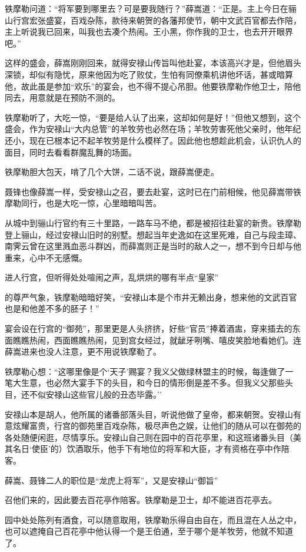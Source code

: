 \documentclass[12pt,oneside]{book}
\begin{document}
铁摩勒问道：``将军要到哪里去？可是要我随行？''薛嵩道：``正是。主上今日在骊山行宫宏张盛宴，百戏杂陈，款待来朝贺的各藩邦使节，朝中文武百官都去作陪，主上听说我已回来，叫我也去凑个热闹。王小黑，你作我的卫士，也去开开眼界吧。''

这样的盛会，薛嵩刚刚回来，就得安禄山传旨叫他赴宴，本该高兴才是，但他眉头深锁，却似有隐忧，原来他因为吃了败仗，生怕有同僚乘机讲他坏话，甚或暗算他，故此虽是参加``欢乐''的宴会，也不得不提心吊胆。他要铁摩勒作他卫士，陪他同去，用意就是在预防不测的。

铁摩勒听了，大吃一惊，``要是给人认了出来，这却如何是好！''但他又想到，这个盛会，作为安禄山``大内总管''的羊牧劳也必然在场；羊牧劳害死他父亲时，他年纪还小，现在已根本记不起羊牧劳是什么模样了。因此他也想趁此机会，认识仇人的面目，同时去看看群魔乱舞的场面。

铁摩勒胆大包天，啃了几个大饼，二话不说，跟薛嵩便走。

聂锋也像薛嵩一样，受安禄山之召，要去赴宴，这时已在门前相候，他见薛嵩带铁摩勒同行，也是大吃一惊，心里暗暗叫苦。

从城中到骊山行官约有三十里路，一路车马不绝，都是被招往赴宴的新贵。铁摩勒登上骊山，经过安禄山旧时的别墅。想起当年史逸如在这里死难，自己与段圭璋、南霁云曾在这里溅血恶斗群凶，而薛嵩则正是当时的敌人之一，想不到今日却与他重来，心中不无感慨。

进人行宫，但听得处处喧闹之声，乱烘烘的哪有半点``皇家''

的尊严气象，铁摩勒暗暗好笑，``安禄山本是个市井无赖出身，想来他的文武百官也是和他差不多的胚子！''

宴会设在行宫的``御苑''，那里更是人头挤挤，好些``官员''捧着酒盅，穿来插去的东面瞧瞧热闹，西面瞧瞧热闹，见到宫女经过，就龇牙咧嘴、嘻皮笑脸地看她们。连薛嵩进来也没人注意，更不用说铁摩勒了。

铁摩勒心想：``这哪里像是个`天子'赐宴？我义父做绿林盟主的时候，每逢做了一笔大生意，也必然大宴手下的头目，和今日的情形倒是差不多。但我义父那些头目，还不似安禄山这些官儿般的丑态毕露。''

安禄山本是胡人，他所属的诸番部落头目，听说他做了皇帝，都来朝贺。安禄山有意炫耀富贵，行宫的御苑里百戏杂陈，极尽声色之娱，让他们的随从可以在御苑的各处随便闲逛，尽情享乐。安禄山自己则在园中的百花亭里，和这班诸番头目（美其名日`使臣'的）饮酒取乐，他手下有地位的将军和大臣，才有资格在亭中作陪客。

薛嵩、聂锋二人的职位是``龙虎上将军''，又是安禄山``御旨''

召他们来的，因此要去百花亭作陪客。铁摩勒是卫士，却不能进百花亭去。

园中处处陈列有酒食，可以随意取用，铁摩勒乐得自由自在，而且混在人丛之中，也可以遮掩自己百花亭中他认得一个是王伯通，至于哪个是羊牧劳，他就不知道了。
\end{document}
